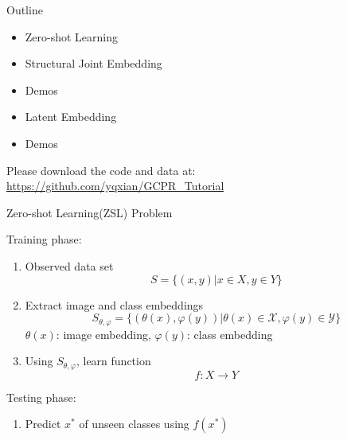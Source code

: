 \documentclass[mathserif, xcolor=table]{beamer}
\def\X{\mathcal{X}}
\def\Y{\mathcal{Y}}
\def\X{\mathcal{X}}
\def\Y{\mathcal{Y}}
\begin{document}
\begin{frame}{Outline}

\begin{itemize}
\item{Zero-shot Learning}
\item{Structural Joint Embedding}
\item{Demos}
\item{Latent Embedding}
\item{Demos}


\end{itemize}

Please download the code and data at: \\
\url{https://github.com/yqxian/GCPR_Tutorial}
\end{frame}

\begin{frame}{Zero-shot Learning(ZSL) Problem}

Training phase: 
\begin{enumerate}
\item{Observed data set} 
\begin{equation*}
S = \{(x, y)| x \in X, y \in Y \}
\end{equation*}
\pause
\item{Extract image and class embeddings} 
\begin{equation*}
S_{\theta, \varphi} = \{(\theta(x), \varphi(y))| \theta(x) \in \X, \varphi(y) \in \Y \}
\end{equation*}
$\theta(x)$: image embedding, $\varphi(y)$: class embedding
\pause
\item{Using $S_{\theta, \varphi} $, learn function}
\begin{equation*}
f: X \rightarrow Y
\end{equation*}

\end{enumerate}
\pause

Testing phase: 
\begin{enumerate}
\item{Predict $x^*$ of unseen classes using $f(x^*)$} 

\end{enumerate}

\end{frame}
\end{document}
